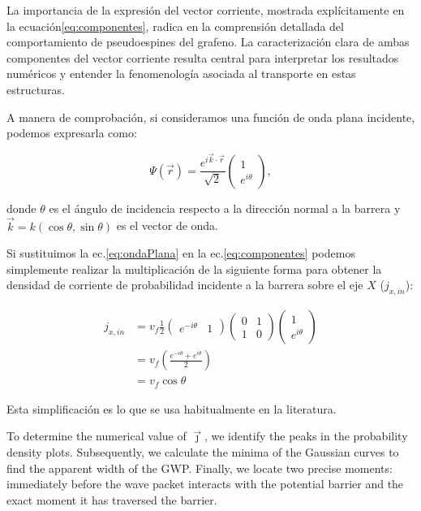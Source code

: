 La importancia de la expresión del vector corriente, mostrada explícitamente en la ecuación\eqref{eq:componentes}, radica en la comprensión detallada del comportamiento de pseudoespines del grafeno.
La caracterización clara de ambas componentes del vector corriente resulta central para interpretar los resultados numéricos y entender la fenomenología asociada al transporte en estas estructuras.

A manera de comprobación, si consideramos una función de onda plana incidente, podemos expresarla como:

\begin{equation}
    \label{eq:ondaPlana}
    \Psi(\vec{r})=\frac{e^{i\vec{k}\cdot\vec{r}}}{\sqrt{2}}
    \begin{pmatrix}
        1 \\ e^{i\theta}
    \end{pmatrix},
\end{equation}

\noindent donde $\theta$ es el ángulo de incidencia respecto a la dirección normal a la barrera y $\vec{k} = k(\cos\theta,\sin\theta)$ es el vector de onda.

Si sustituimos la ec.\eqref{eq:ondaPlana} en la ec.\eqref{eq:componentes} podemos simplemente realizar la multiplicación de la siguiente forma para obtener la densidad de corriente de probabilidad incidente a la barrera sobre el eje $X$ ($j_{x,in}$):

\begin{align}
    \label{eq:jdemostrada}
    j_{x, in}&=v_f\frac{1}{2}
    \begin{pmatrix}
        e^{-i\theta} & 1
    \end{pmatrix}
    \begin{pmatrix}
        0 & 1 \\
        1 & 0
    \end{pmatrix}
    \begin{pmatrix}
        1 \\ e^{i\theta}
    \end{pmatrix}\nonumber \\
    &=v_f\left( \frac{e^{-i\theta} + e^{i\theta}}{2} \right)\nonumber \\
    &=v_f\cos\theta
\end{align}

Esta simplificación es lo que se usa habitualmente en la literatura\cite{DahalJPhysChemSolids2017, WuJAP2009}.

To determine the numerical value of $\vec{\jmath}$, we identify the peaks in the probability density plots.
Subsequently, we calculate the minima of the Gaussian curves to find the apparent width of the GWP. Finally, we locate two precise moments: immediately before the wave packet interacts with the potential barrier and the exact moment it has traversed the barrier.

